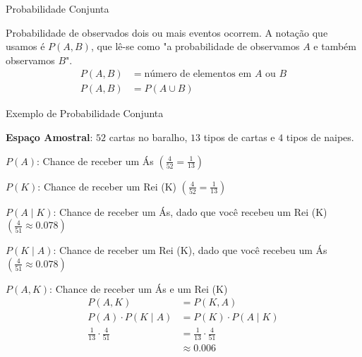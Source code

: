 \begin{frame}{Probabilidade Conjunta}
	\begin{defn}
		Probabilidade de observados dois ou mais eventos ocorrem. \newline \newline
		A notação que usamos é $P(A, B)$, que lê-se como
		"a probabilidade de observamos $A$ e também observamos $B$". \newline \newline
		$$
			\begin{aligned}
				P(A,B) & = \text{número de elementos em $A$ ou $B$} \\
				P(A,B) & = P(A \cup B)
			\end{aligned}
		$$
	\end{defn}
\end{frame}

\begin{frame}{Exemplo de Probabilidade Conjunta}
	\begin{exemplo}
		\begin{vfilleditems}
			{\footnotesize
				\item \textbf{Espaço Amostral}: $52$ cartas no baralho, $13$ tipos de cartas e $4$ tipos de naipes.
				\item $P(A)$: Chance de receber um Ás $\left( \frac{4}{52} = \frac{1}{13}\right)$
				\item $P(K)$: Chance de receber um Rei (K) $\left( \frac{4}{52} = \frac{1}{13} \right)$
				\item $P(A \mid K)$: Chance de receber um Ás, dado que você recebeu um Rei (K) $\left( \frac{4}{51} \approx 0.078 \right)$
				\item $P(K \mid A)$: Chance de receber um Rei (K), dado que você recebeu um Ás $\left( \frac{4}{51} \approx 0.078 \right)$
			}
			\item $P(A, K)$: Chance de receber um Ás e um Rei (K)
			$$
				\begin{aligned}
					P(A, K)                         & = P(K, A)                         \\
					P(A) \cdot P(K \mid A)          & = P(K) \cdot P(A \mid K)          \\
					\frac{1}{13} \cdot \frac{4}{51} & = \frac{1}{13} \cdot \frac{4}{51} \\
					                                & \approx 0.006
				\end{aligned}
			$$
		\end{vfilleditems}
	\end{exemplo}
\end{frame}

